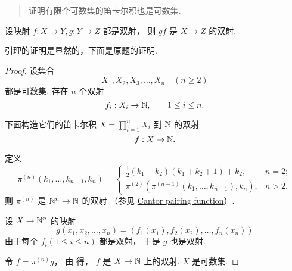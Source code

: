 \begin{quotation}
    证明有限个可数集的笛卡尔积也是可数集.
\end{quotation}

\begin{lemma}\label{lem:ch01:sec05:2}
    设映射 $f: X \to Y, g: Y \to Z$ 都是双射，
    则 $gf$ 是 $X \to Z$ 的双射.
\end{lemma}

引理的证明是显然的，下面是原题的证明.
\begin{proof}
    设集合
    \[
        X_1, X_2, X_3, \dots, X_n \quad(n \ge 2)
    \]
    都是可数集. 存在 $n$ 个双射
    \begin{equation}
        f_i: X_i \to \mathbb{N}, \qquad 1 \le i \le n.
    \end{equation}

    下面构造它们的笛卡尔积
    $X = \prod_{i=1}^n{X_i}$
    到
    $\mathbb{N}$
    的双射
    \begin{equation*}
        f: X \to \mathbb{N}.
    \end{equation*}

    定义
    \begin{equation}
        \pi^{(n)}(k_1, \dots, k_{n-1}, k_n) = \begin{cases}
            \frac{1}{2}(k_1 + k_2)(k_1 + k_2 + 1) + k_2, & n = 2; \\
            \pi^{(2)}(
                \pi^{(n - 1)}(k_1, \dots, k_{n-1}),
                k_n
            ), & n > 2.
        \end{cases}
    \end{equation}
    则 $\pi^{(n)}$ 是 $\mathbb{N}^n \to \mathbb{N}$ 的双射
    （参见 \href{https://en.wikipedia.org/wiki/Pairing_function#Cantor_pairing_function}{Cantor pairing function}）.

    设 $X \to \mathbb{N}^n$ 的映射
    \begin{equation}
        g(x_1, x_2, \dots, x_n) = (f_1(x_1), f_2(x_2), \dots, f_n(x_n))
    \end{equation}
    由于每个 $f_i (1 \le i \le n)$ 都是双射，
    于是 $g$ 也是双射.

    令 $f = \pi^{(n)}g$，
    由 得，
    $f$ 是 $X \to \mathbb{N}$ 上的双射.
    $X$ 是可数集.
\end{proof}

